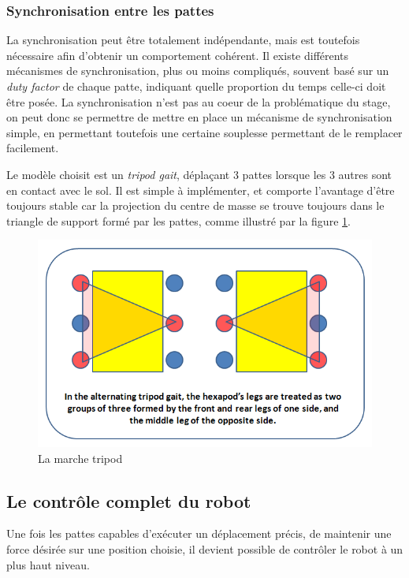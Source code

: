 \documentclass{tnreport}
\begin{document}
\subsubsection{Synchronisation entre les pattes}
La synchronisation peut être totalement indépendante, mais est toutefois nécessaire afin d'obtenir un comportement cohérent. Il existe différents mécanismes de synchronisation, plus ou moins compliqués, souvent basé sur un \textit{duty factor} de chaque patte, indiquant quelle proportion du temps celle-ci doit être posée. La synchronisation n'est pas au coeur de la problématique du stage, on peut donc se permettre de mettre en place un mécanisme de synchronisation simple, en permettant toutefois une certaine souplesse permettant de le remplacer facilement. 

Le modèle choisit est un \textit{tripod gait}, déplaçant 3 pattes lorsque les 3 autres sont en contact avec le sol. Il est simple à implémenter, et comporte l'avantage d'être toujours stable car la projection du centre de masse se trouve toujours dans le triangle de support formé par les pattes, comme illustré par la figure \ref{fig:tripod}.

\begin{figure}
    \centering
    \includegraphics[width=\textwidth]{figures/tripod}
    \caption{La marche tripod}
    \label{fig:tripod}
\end{figure}

\subsection{Le contrôle complet du robot}
Une fois les pattes capables d'exécuter un déplacement précis, de maintenir une force désirée sur une position choisie, il devient possible de contrôler le robot à un plus haut niveau.
\end{document}
